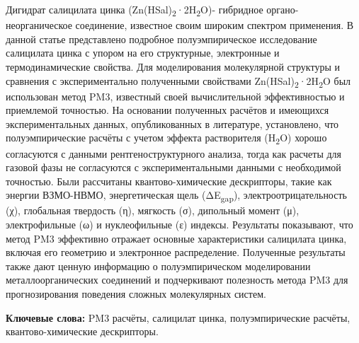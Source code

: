 Дигидрат салицилата цинка
(Zn(HSal)\textsubscript{2}·2H\textsubscript{2}O)- гибридное
органо-неорганическое соединение, известное своим широким спектром
применения. В данной статье представлено подробное полуэмпирическое
исследование салицилата цинка с упором на его структурные, электронные и
термодинамические свойства. Для моделирования молекулярной структуры и
сравнения с экспериментально полученными свойствами
Zn(HSal)\textsubscript{2}·2H\textsubscript{2}O был использован метод
PM3, известный своей вычислительной эффективностью и приемлемой
точностью. На основании полученных расчётов и имеющихся
экспериментальных данных, опубликованных в литературе, установлено, что
полуэмпирические расчёты с учетом эффекта растворителя
(H\textsubscript{2}O) хорошо согласуются с данными рентгеноструктурного
анализа, тогда как расчеты для газовой фазы не согласуются с
экспериментальными данными с необходимой точностью. Были рассчитаны
квантово-химические дескрипторы, такие как энергии ВЗМО-НВМО,
энергетическая щель (ΔE\textsubscript{gap}), электроотрицательность (χ),
глобальная твердость (η), мягкость (σ), дипольный момент (μ),
электрофильные (ω) и нуклеофильные (ε) индексы. Результаты показывают,
что метод PM3 эффективно отражает основные характеристики салицилата
цинка, включая его геометрию и электронное распределение. Полученные
результаты также дают ценную информацию о полуэмпирическом моделировании
металлоорганических соединений и подчеркивают полезность метода PM3 для
прогнозирования поведения сложных молекулярных систем.

{\bfseries Ключевые слова:} PM3 расчёты, салицилат цинка, полуэмпирические
расчёты, квантово-химические дескрипторы.

